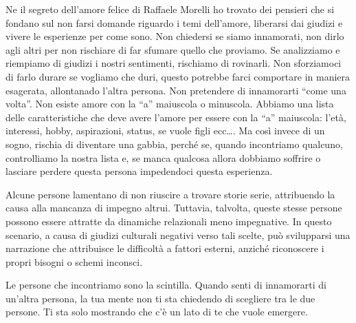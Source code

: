\documentclass[12pt]{book} %
\begin{document}
Ne il segreto dell'amore felice di Raffaele Morelli ho trovato dei
pensieri che si fondano sul non farsi domande riguardo i temi dell'amore, liberarsi dai giudizi e
vivere le esperienze per come sono. Non chiedersi se siamo innamorati, non dirlo agli altri per non rischiare di far sfumare quello
che proviamo. Se analizziamo e riempiamo di giudizi i nostri sentimenti, rischiamo di rovinarli. Non sforziamoci di
farlo durare se vogliamo che duri, questo potrebbe farci comportare in maniera esagerata, allontanado l'altra persona.
Non pretendere di innamorarti “come una volta”. Non esiste amore con la “a” maiuscola o minuscola. Abbiamo una lista
delle caratteristiche che deve avere l'amore per essere con la “a” maiuscola:
l'età, interessi, hobby, aspirazioni, status, se vuole figli ecc…. Ma così invece di un sogno,
rischia di diventare una gabbia, perché se, quando incontriamo qualcuno, controlliamo la nostra lista e, se manca qualcosa allora
dobbiamo soffrire o lasciare perdere questa persona impedendoci questa esperienza.

Alcune persone lamentano di non riuscire a trovare storie serie, attribuendo la causa alla mancanza di impegno altrui. Tuttavia, talvolta, queste stesse persone possono essere attratte da dinamiche relazionali meno impegnative. In questo scenario, a causa di giudizi culturali negativi verso tali scelte, può svilupparsi una narrazione che attribuisce le difficoltà a fattori esterni, anziché riconoscere i propri bisogni o schemi inconsci.

Le persone che incontriamo sono la scintilla. Quando senti di innamorarti di un'altra persona, la tua mente non ti sta chiedendo di
scegliere tra le due persone. Ti sta solo mostrando che c'è un lato di te che vuole emergere. 
\end{document}

